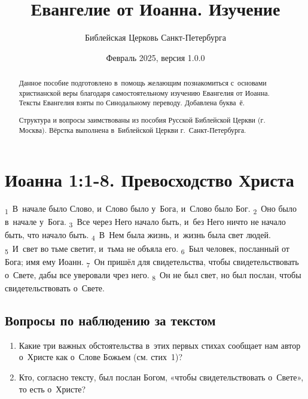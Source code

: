 \documentclass[a4paper,12pt]{article}
\title{Евангелие от Иоанна. Изучение}
\author{Библейская Церковь Санкт-Петербурга}
\date{\small{Февраль 2025, версия 1.0.0}}
\begin{document}
\maketitle

\thispagestyle{empty}

\begin{abstract}
    Данное пособие подготовлено в~помощь желающим познакомиться с~основами христианской веры благодаря самостоятельному изучению Евангелия от Иоанна. Тексты Евангелия взяты по Синодальному переводу. Добавлена буква~ё.
    
    Структура и вопросы заимствованы из пособия Русской Библейской Церкви (г. Москва). Вёрстка выполнена в~Библейской Церкви г.\ Санкт-Петербурга. 
\end{abstract}

\newpage

\tableofcontents

\newpage

\newcommand{\myline}{\noindent\makebox[\linewidth]{\rule{\linewidth}{0.1pt}}}

\section{Иоанна 1:1-8. Превосходство Христа}

\textsubscript{1}~В~начале было Слово, и~Слово было у~Бога, и~Слово было Бог.
\textsubscript{2}~Оно было в~начале у~Бога.
\textsubscript{3}~Все через Него начало быть, и~без Него ничто не начало быть, что начало быть.
\textsubscript{4}~В~Нем была жизнь, и~жизнь была свет людей.
\textsubscript{5}~И~свет во тьме светит, и~тьма не объяла его.
\textsubscript{6}~Был человек, посланный от Бога; имя ему Иоанн.
\textsubscript{7}~Он пришёл для свидетельства, чтобы свидетельствовать о~Свете, дабы все уверовали чрез него.
\textsubscript{8}~Он не был свет, но был послан, чтобы свидетельствовать о~Свете.

\subsection*{Вопросы по наблюдению за текстом}
\begin{enumerate}
    \item Какие три важных обстоятельства в~этих первых стихах сообщает нам автор о~Христе как о~Слове Божьем (см. стих~1)? 
    
    \myline

    \myline

    \myline
    
    \item Кто, согласно тексту, был послан Богом, «чтобы свидетельствовать о~Свете», то есть о~Христе?
    
    \myline

\end{enumerate}
\end{document}
